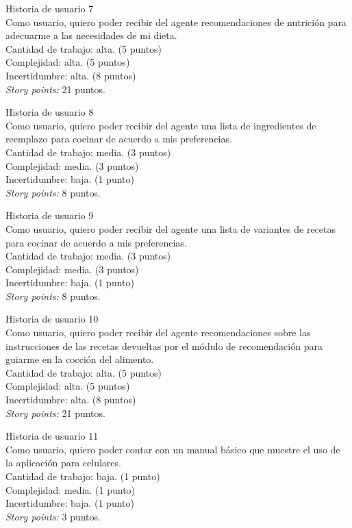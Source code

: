 \documentclass[
11pt, %
]{charter}
\begin{document}
Historia de usuario 7 \\
Como usuario, quiero poder recibir del agente recomendaciones de nutrición para adecuarme a las necesidades de mi dieta. \\
Cantidad de trabajo: alta. (5 puntos)\\
Complejidad: alta. (5 puntos)\\
Incertidumbre: alta. (8 puntos)\\
\textit{Story points:} 21 puntos.

Historia de usuario 8 \\
Como usuario, quiero poder recibir del agente una lista de ingredientes de reemplazo para cocinar de acuerdo a mis preferencias. \\
Cantidad de trabajo: media. (3 puntos)\\
Complejidad: media. (3 puntos)\\
Incertidumbre: baja. (1 punto)\\
\textit{Story points:} 8 puntos.

Historia de usuario 9 \\
Como usuario, quiero poder recibir del agente una lista de variantes de recetas para cocinar de acuerdo a mis preferencias. \\
Cantidad de trabajo: media. (3 puntos)\\
Complejidad: media. (3 puntos)\\
Incertidumbre: baja. (1 punto)\\
\textit{Story points:} 8 puntos.

Historia de usuario 10 \\
Como usuario, quiero poder recibir del agente recomendaciones sobre las instrucciones de las recetas devueltas por el módulo de recomendación para guiarme en la cocción del alimento. \\
Cantidad de trabajo: alta. (5 puntos)\\
Complejidad: alta. (5 puntos)\\
Incertidumbre: alta. (8 puntos)\\
\textit{Story points:} 21 puntos.

Historia de usuario 11 \\
Como usuario, quiero poder contar con un manual básico que muestre el uso de la aplicación para celulares.\\
Cantidad de trabajo: baja. (1 punto)\\
Complejidad: media. (1 punto)\\
Incertidumbre: baja. (1 punto)\\
\textit{Story points:} 3 puntos.
\end{document}
